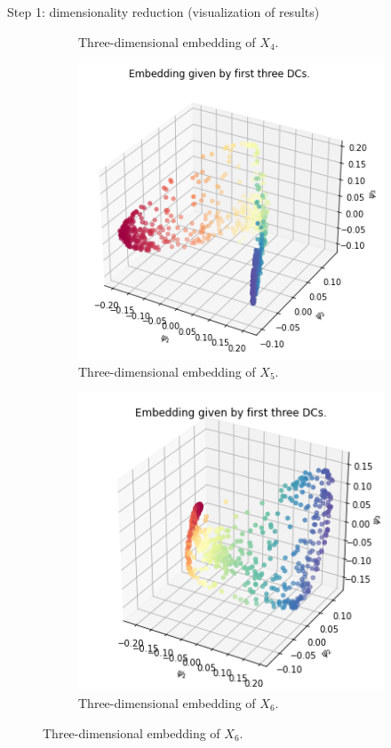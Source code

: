 \documentclass[xcolor={dvipsnames,svgnames}]{beamer}
\begin{document}
\begin{frame}{Step 1: dimensionality reduction (visualization of results)}
\begin{figure}[H]
\begin{subfigure}[b]{0.3\textwidth}
    \caption{Three-dimensional embedding of $X_4$.}
\end{subfigure}
\hfill
\begin{subfigure}[b]{0.3\textwidth}
    \includegraphics[width=\textwidth]{figures/X5_embedding.png}
    \caption{Three-dimensional embedding of $X_5$.}
\end{subfigure}
\hfill
\begin{subfigure}[b]{0.3\textwidth}
    \includegraphics[width=\textwidth]{figures/X6_embedding.png}
    \caption{Three-dimensional embedding of $X_6$.}
\end{subfigure}
\end{figure}
\end{frame}
\end{document}
